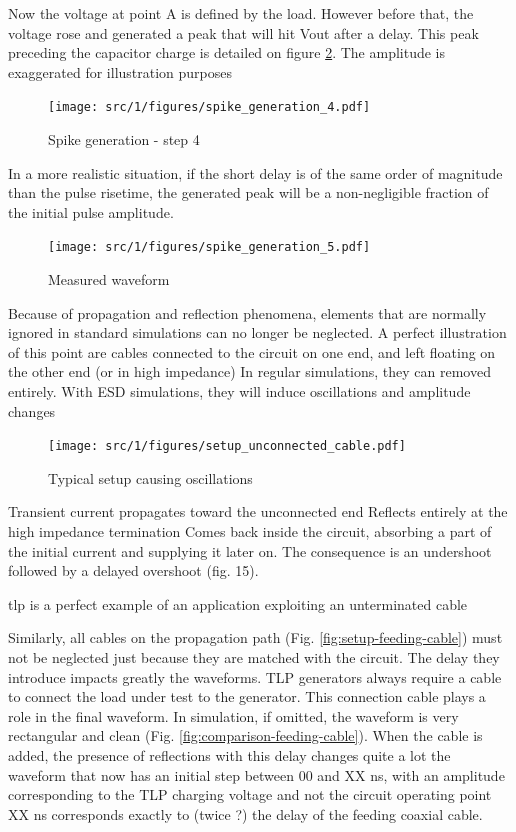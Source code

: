Now the voltage at point A is defined by the load.
However before that, the voltage rose and generated a peak that will hit Vout after a delay.
This peak preceding the capacitor charge is detailed on figure \ref{fig:spike-step-4}.
The amplitude is exaggerated for illustration purposes

\begin{figure}[!h]
  \centering
  \texttt{[image: src/1/figures/spike\_generation\_4.pdf]}
  \caption{Spike generation - step 4}
  \label{fig:spike-step-4}
\end{figure}

In a more realistic situation, if the short delay is of the same order of magnitude than the pulse risetime, the generated peak will be a non-negligible fraction of the initial pulse amplitude.

\begin{figure}[!h]
  \centering
  \texttt{[image: src/1/figures/spike\_generation\_5.pdf]}
  \caption{Measured waveform}
  \label{fig:spike-step-4}
\end{figure}

Because of propagation and reflection phenomena, elements that are normally ignored in standard simulations can no longer be neglected.
A perfect illustration of this point are cables connected to the circuit on one end, and left floating on the other end (or in high impedance)
In regular simulations, they can removed entirely.
With ESD simulations, they will induce oscillations and amplitude changes

\begin{figure}[!h]
  \centering
  \texttt{[image: src/1/figures/setup\_unconnected\_cable.pdf]}
  \caption{Typical setup causing oscillations}
  \label{fig:setup-unconnected-cable}
\end{figure}

Transient current propagates toward the unconnected end
Reflects entirely at the high impedance termination
Comes back inside the circuit, absorbing a part of the initial current and supplying it later on.
The consequence is an undershoot followed by a delayed overshoot (fig. 15).

\gls{tlp} is a perfect example of an application exploiting an unterminated cable

Similarly, all cables on the propagation path (Fig. \ref{fig:setup-feeding-cable}) must not be neglected just because they are matched with the circuit.
The delay they introduce impacts greatly the waveforms.
TLP generators always require a cable to connect the load under test to the generator.
This connection cable plays a role in the final waveform.
In simulation, if omitted, the waveform is very rectangular and clean (Fig. \ref{fig:comparison-feeding-cable}).
When the cable is added, the presence of reflections with this delay changes quite a lot the waveform that now has an initial step between 00 and XX ns, with an amplitude corresponding to the TLP charging voltage and not the circuit operating point
XX ns corresponds exactly to (twice ?) the delay of the feeding coaxial cable.

